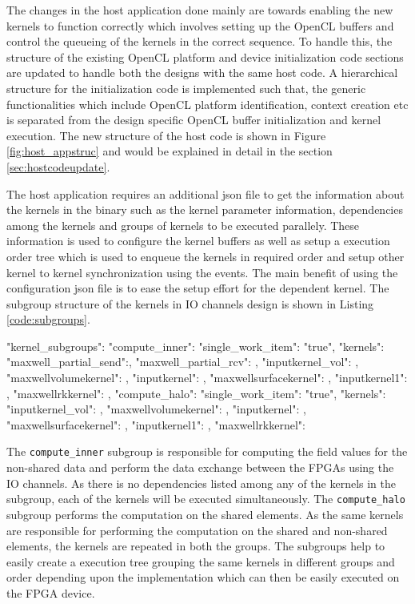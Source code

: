 The changes in the host application done mainly are towards enabling the new kernels to function correctly
which involves setting up the OpenCL buffers and control the queueing of the kernels in the correct sequence.
To handle this, the structure of the existing OpenCL platform and device initialization code sections are
updated to handle both the designs with the same host code. A hierarchical structure for the initialization code
is implemented such that, the generic functionalities which include OpenCL platform identification,
context creation etc is separated from the design specific OpenCL buffer
initialization and kernel execution. The new structure of the host code is shown
in Figure \ref{fig:host_appstruc} and would be explained in detail in the section \ref{sec:hostcodeupdate}.

The host application requires an additional json file to get the information about the kernels in the binary such as
the kernel parameter information, dependencies among the kernels and groups of kernels to be executed parallely.
These information is used to configure the kernel buffers as well as setup a execution order tree which is used
to enqueue the kernels in required order and setup other kernel to kernel synchronization using the events.
The main benefit of using the configuration json file is to ease the setup effort for the dependent kernel.
The subgroup structure of the kernels in IO channels design is shown in Listing \ref{code:subgroups}.

\begin{JsonCode}[caption=Kernel subgroups used in Multi FPGA design to enqueue kernels, frame=tlrb, label=code:subgroups]
"kernel_subgroups":
{
    "compute_inner":
    {
        "single_work_item": "true",
        "kernels":
        {
            "maxwell_partial_send":{},
            "maxwell_partial_rcv": {},
            "inputkernel_vol": {},
            "maxwellvolumekernel": {},
            "inputkernel": {},
            "maxwellsurfacekernel": {},
            "inputkernel1": {},
            "maxwellrkkernel": {}
        }
    },
    "compute_halo":
    {
        "single_work_item": "true",
        "kernels":
        {
            "inputkernel_vol": {},
            "maxwellvolumekernel": {},
            "inputkernel": {},
            "maxwellsurfacekernel": {},
            "inputkernel1": {},
            "maxwellrkkernel": {}
        }
    }
}
\end{JsonCode}

The \texttt{compute\_inner} subgroup is responsible for computing the field values for the non-shared
data and perform the data exchange between the FPGAs using the IO channels. As there is no dependencies
listed among any of the kernels in the subgroup, each of the kernels will be executed simultaneously.
The \texttt{compute\_halo} subgroup performs the computation on the shared elements. As the same kernels
are responsible for performing the computation on the shared and non-shared elements, the kernels are
repeated in both the groups. The subgroups help to easily create a execution tree grouping
the same kernels in different groups and order depending upon the implementation which can then be
easily executed on the FPGA device.

